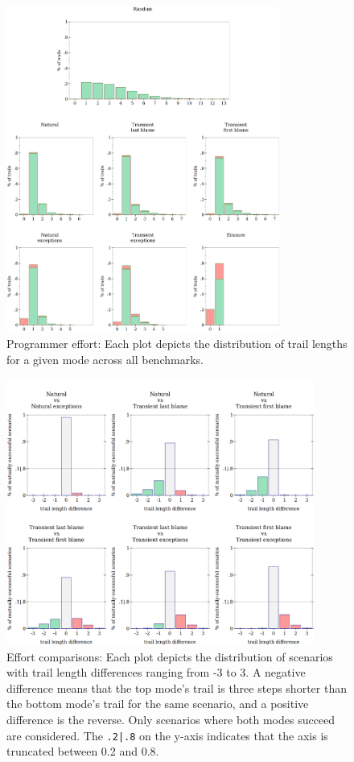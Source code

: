 \begin{figure}
  \centering
  \includegraphics[width=0.8\textwidth]{./plots/bt-lengths-table}
  \caption{Programmer effort: Each plot depicts the distribution of trail
  lengths for a given mode across all benchmarks.}
  \label{fig:effort-table}
\end{figure}

\begin{figure}
  \centering
  \includegraphics[width=0.9\textwidth]{./plots/bt-length-comparisons}
  \caption{Effort comparisons: Each plot depicts the distribution of scenarios with trail length differences ranging from -3 to 3.
  A negative difference means that the top mode's trail is three steps shorter than the bottom mode's trail for the same scenario, and a positive difference is the reverse.
  Only scenarios where both modes succeed are considered.
  The \texttt{.2|.8} on the y-axis indicates that the axis is truncated between 0.2 and 0.8.}
  \label{fig:effort-comparisons}
\end{figure}


